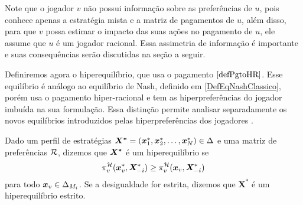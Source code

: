 Note que o jogador $v$ não possui informação sobre as preferências de $u$, pois conhece apenas a estratégia mista e a matriz de pagamentos de $u$, além disso, para que $v$ possa estimar o impacto das suas ações no pagamento de $u$, ele assume que $u$ é um jogador racional. Essa assimetria de informação é importante e suas consequências serão discutidas na seção a seguir. 

Definiremos agora o hiperequilíbrio, que usa o pagamento $\eqref{defPgtoHR}$. Esse equilíbrio é análogo ao equilíbrio de Nash, definido em \ref{DefEqNashClassico}, porém usa o pagamento hiper-racional e tem as hiperpreferências do jogador imbuída na sua formulação. Essa distinção permite analisar separadamente os novos equilíbrios introduzidos pelas hiperpreferências dos jogadores \cite{askari2019behavioral}.

\begin{definition}
    \label{defHiperEq}
    Dado um perfil de estratégias $\boldsymbol{X^*}=(\boldsymbol{x}^*_{1},\boldsymbol{x}^*_{2},\dots,\boldsymbol{x}^*_{N})\in\Delta$ e uma matriz de preferências $\mathcal{R}$, dizemos que $\boldsymbol{X^*}$ é um hiperequilíbrio se
    \begin{equation*}
        \pi^{\mathcal{H}}_v(\boldsymbol{x}^*_v,\boldsymbol{X}^*_{-i})\geq \pi^{\mathcal{H}}_v(\boldsymbol{x}_v,\boldsymbol{X}^*_{-i})
    \end{equation*}
    para todo $\boldsymbol{x}_v\in\Delta_{M_i}$. Se a desigualdade for estrita, dizemos que $\boldsymbol{X^*}$ é um hiperequilíbrio estrito.
\end{definition}


